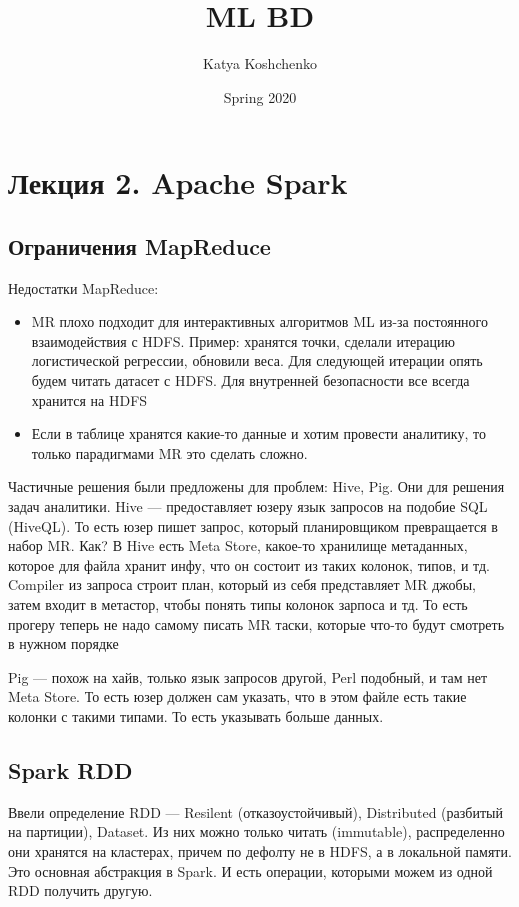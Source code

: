 \documentclass[12pt]{article}
\title{ML BD}
\date{Spring 2020}
\begin{document}
\author{Katya Koshchenko}
\maketitle
    
\section{Лекция 2. Apache Spark}

\subsection{Ограничения MapReduce}

Недостатки MapReduce:
\begin{itemize}
    \item MR плохо подходит для интерактивных алгоритмов ML из-за постоянного взаимодействия с HDFS. Пример: хранятся точки, сделали итерацию логистической регрессии, обновили веса. Для следующей итерации опять будем читать датасет с HDFS. Для внутренней безопасности все всегда хранится на HDFS
    \item Если в таблице хранятся какие-то данные и хотим провести аналитику, то только парадигмами MR это сделать сложно. 
\end{itemize}

Частичные решения были предложены для проблем: Hive, Pig. Они для решения задач аналитики. Hive --- предоставляет юзеру язык запросов на подобие SQL (HiveQL). То есть юзер пишет запрос, который планировщиком превращается в набор MR. Как? В Hive есть Meta Store, какое-то хранилище метаданных, которое для файла хранит инфу, что он состоит из таких колонок, типов, и тд. Compiler из запроса строит план, который из себя представляет MR джобы, затем входит в метастор, чтобы понять типы колонок зарпоса и тд. То есть прогеру теперь не надо самому писать MR таски, которые что-то будут смотреть в нужном порядке

Pig --- похож на хайв, только язык запросов другой, Perl подобный, и там нет Meta Store. То есть юзер должен сам указать, что в этом файле есть такие колонки с такими типами. То есть указывать больше данных. 

\subsection{Spark RDD}

Ввели определение RDD --- Resilent (отказоустойчивый), Distributed (разбитый на партиции), Dataset. Из них можно только читать (immutable), распределенно они хранятся на кластерах, причем по дефолту не в HDFS, а в локальной памяти. Это основная абстракция в Spark. И есть операции, которыми можем из одной RDD получить другую.
\end{document}
